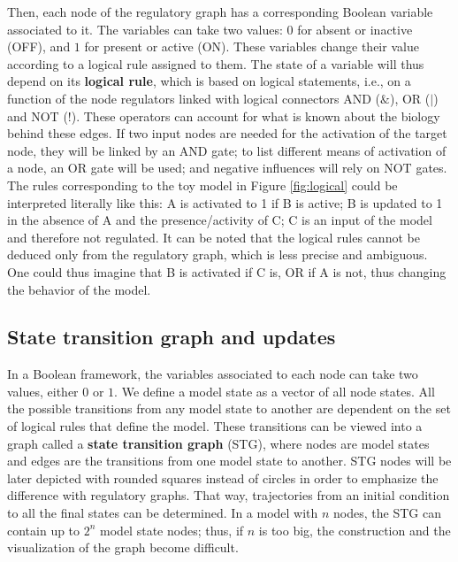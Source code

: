 \documentclass[a4paper,12pt,twoside,onecolumn,openright,final,oldfontcommands]{memoir}
\begin{document}
Then, each node of the regulatory graph has a corresponding Boolean
variable associated to it. The variables can take two values: \(0\) for
absent or inactive (OFF), and \(1\) for present or active (ON). These
variables change their value according to a logical rule assigned to
them. The state of a variable will thus depend on its \textbf{logical
rule}, which is based on logical statements, i.e., on a function of the
node regulators linked with logical connectors AND (\(\&\)), OR (\(|\))
and NOT (\(!\)). These operators can account for what is known about the
biology behind these edges. If two input nodes are needed for the
activation of the target node, they will be linked by an AND gate; to
list different means of activation of a node, an OR gate will be used;
and negative influences will rely on NOT gates. The rules corresponding
to the toy model in Figure \ref{fig:logical} could be interpreted
literally like this: A is activated to 1 if B is active; B is updated to
1 in the absence of A and the presence/activity of C; C is an input of
the model and therefore not regulated. It can be noted that the logical
rules cannot be deduced only from the regulatory graph, which is less
precise and ambiguous. One could thus imagine that B is activated if C
is, OR if A is not, thus changing the behavior of the model.

\subsection{State transition graph and
updates}\label{state-transition-graph-and-updates}

In a Boolean framework, the variables associated to each node can take
two values, either \(0\) or \(1\). We define a model state as a vector
of all node states. All the possible transitions from any model state to
another are dependent on the set of logical rules that define the model.
These transitions can be viewed into a graph called a \textbf{state
transition graph} (STG), where nodes are model states and edges are the
transitions from one model state to another. STG nodes will be later
depicted with rounded squares instead of circles in order to emphasize
the difference with regulatory graphs. That way, trajectories from an
initial condition to all the final states can be determined. In a model
with \(n\) nodes, the STG can contain up to \(2^n\) model state nodes;
thus, if \(n\) is too big, the construction and the visualization of the
graph become difficult.
\end{document}
